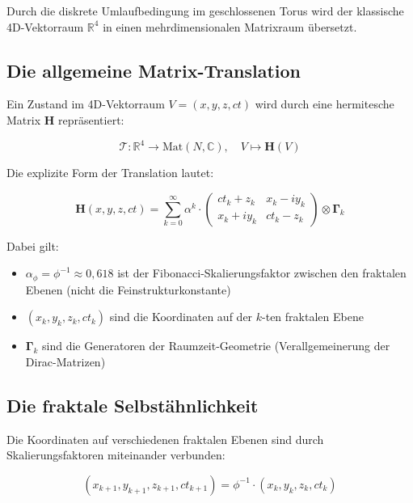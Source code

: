 	Durch die diskrete Umlaufbedingung im geschlossenen Torus wird der klassische 4D-Vektorraum $\mathbb{R}^4$ in einen mehrdimensionalen Matrixraum übersetzt.
	
	\subsection{Die allgemeine Matrix-Translation}
	
	Ein Zustand im 4D-Vektorraum $V = (x, y, z, ct)$ wird durch eine hermitesche Matrix $\mathbf{H}$ repräsentiert:
	
	\begin{equation}
		\mathcal{T}: \mathbb{R}^4 \rightarrow \text{Mat}(N, \mathbb{C}), \quad V \mapsto \mathbf{H}(V)
	\end{equation}
	
	Die explizite Form der Translation lautet:
	
	\begin{equation}
		\mathbf{H}(x,y,z,ct) = \sum_{k=0}^{\infty} \alpha^k \cdot 
		\begin{pmatrix}
			ct_k + z_k & x_k - iy_k \\
			x_k + iy_k & ct_k - z_k
		\end{pmatrix} \otimes \mathbf{\Gamma}_k
	\end{equation}
	
	Dabei gilt:
	\begin{itemize}
		\item $\alpha_\phi = \phi^{-1} \approx 0{,}618$ ist der Fibonacci-Skalierungsfaktor zwischen den fraktalen Ebenen (nicht die Feinstrukturkonstante)
		\item $(x_k, y_k, z_k, ct_k)$ sind die Koordinaten auf der $k$-ten fraktalen Ebene
		\item $\mathbf{\Gamma}_k$ sind die Generatoren der Raumzeit-Geometrie (Verallgemeinerung der Dirac-Matrizen)
	\end{itemize}
	
	\subsection{Die fraktale Selbstähnlichkeit}
	
	Die Koordinaten auf verschiedenen fraktalen Ebenen sind durch Skalierungsfaktoren miteinander verbunden:
	
	\begin{equation}
		(x_{k+1}, y_{k+1}, z_{k+1}, ct_{k+1}) = \phi^{-1} \cdot (x_k, y_k, z_k, ct_k)
	\end{equation}
	
